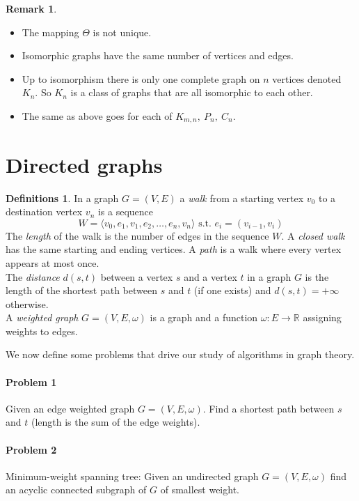 \documentclass{article}
\theoremstyle{definition}
\newtheorem*{defns}{Definitions}
\newtheorem*{rem}{Remark}
\newcommand{\RR}{\mathbb{R}}
\begin{document}
\begin{rem}
\begin{itemize}
\item The mapping $\Theta$ is not unique.
\item Isomorphic graphs have the same number of vertices and edges.
\item Up to isomorphism there is only one complete graph on $n$ vertices denoted $K_n$.
So $K_n$ is a class of graphs that are all isomorphic to each other.
\item The same as above goes for each of $K_{m,n},\ P_n,\ C_n$.
\end{itemize}
\end{rem}

\section{Directed graphs}

\begin{defns}
In a graph $G= (V,E)$ a \emph{walk} from a starting vertex $v_0$ to a destination vertex $v_n$ is a sequence
$$W=\langle v_0,e_1,v_1,e_2,\ldots,e_n,v_n\rangle\text{ s.t. }e_i=(v_{i-1},v_i)$$
The \emph{length} of the walk is the number of edges in the sequence $W$.
A \emph{closed walk} has the same starting and ending vertices.
A \emph{path} is a walk where every vertex appears at most once.\\
The \emph{distance} $d(s,t)$ between a vertex $s$ and a vertex $t$ in a graph $G$ is the length of the shortest path between $s$ and $t$ (if one exists) and $d(s,t)=+\infty$ otherwise.\\
A \emph{weighted graph} $G= (V,E,\omega)$ is a graph and a function $\omega\colon E\to \RR$ assigning weights to edges.
\end{defns}

We now define some problems that drive our study of algorithms in graph theory.
\paragraph{Problem 1}
Given an edge weighted graph $G=(V,E,\omega)$.
Find a shortest path between $s$ and $t$ (length is the sum of the edge weights).

\paragraph{Problem 2}
Minimum-weight spanning tree:
Given an undirected graph $G=(V,E,\omega)$ find an acyclic connected subgraph of $G$ of smallest weight.
\end{document}
